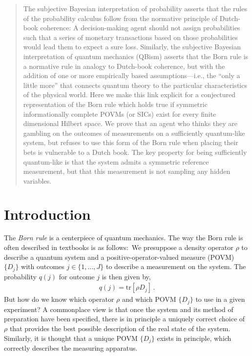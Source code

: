 \documentclass[%
 reprint,superscriptaddress,
 amsmath,amssymb,
 aps,twocolumn,pra
]{revtex4-1}
\newcommand{\eqn}[1]{\begin{eqnarray} #1 \end{eqnarray}}
\newcommand{\tit}[1]{\textit{#1}}
\newcommand{\tr}[1]{  \textrm{tr}\left[ #1 \right]  }
\begin{document}
\begin{abstract}
The subjective Bayesian interpretation of probability asserts that the rules of the probability calculus follow from the normative principle of Dutch-book coherence: A decision-making agent should not assign probabilities such that a series of monetary transactions based on those probabilities would lead them to expect a sure loss. Similarly, the subjective Bayesian interpretation of quantum mechanics (QBism) asserts that the Born rule is a normative rule in analogy to Dutch-book coherence, but with the addition of one or more empirically based assumptions---i.e., the ``only a little more'' that connects quantum theory to the particular characteristics of the physical world. Here we make this link explicit for a conjectured representation of the Born rule which holds true if symmetric informationally complete POVMs (or SICs) exist for every finite dimensional Hilbert space.  We prove that an agent who thinks they are gambling on the outcomes of measurements on a sufficiently quantum-like system, but refuses to use this form of the Born rule when placing their bets is vulnerable to a Dutch book.  The key property for being sufficiently quantum-like is that the system admits a symmetric reference measurement, but that this measurement is not sampling any hidden variables.
\end{abstract}

\maketitle

\section{Introduction}

The \tit{Born rule} is a centerpiece of quantum mechanics. The way the Born rule is often described in textbooks is as follows:\ We presuppose a density operator $\rho$ to describe a quantum system and a positive-operator-valued measure (POVM) $\{ D_j\}$ with outcomes $j \in \{1,\dots,J \}$ to describe a measurement on the system. The probability $q(j)$ for outcome $j$ is then given by,
\eqn{ \label{eqn:Born}
q(j) = \tr{\rho D_j} \, .
}
But how do we know which operator $\rho$ and which POVM $\{ D_j \}$ to use in a given experiment? A commonplace view is that once the system and its method of preparation have been specified, there is in principle a uniquely correct choice of $\rho$ that provides the best possible description of the real state of the system. Similarly, it is thought that a unique POVM $\{ D_j \}$ exists in principle, which correctly describes the measuring apparatus.
\end{document}
